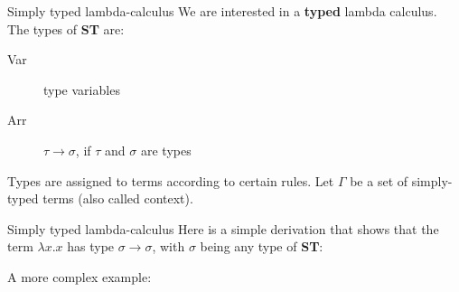 \documentclass[10pt]{beamer}
\begin{document}
\begin{frame}{Simply typed lambda-calculus}
       We are interested in a {\bf typed} lambda calculus. The types of {\bf ST} are:
        \begin{description}
     \item[Var] type variables 
     \item[Arr] $\tau \rightarrow \sigma$, if $\tau$ and $\sigma$ are types
       \end{description}
       Types are assigned to terms according to certain rules. Let $\Gamma$ be a set of simply-typed terms (also called context). 
       \begin{prooftree}
                 \end{prooftree}

         \begin{prooftree}
         \end{prooftree}

         \begin{prooftree}
         \end{prooftree}
\end{frame}
\begin{frame}{Simply typed lambda-calculus}
         Here is a simple derivation that shows that the term $\lambda x. x$ has type $\sigma \rightarrow \sigma$, with $\sigma$ being any type of {\bf ST}: \begin{prooftree}
         \end{prooftree}

A more complex example:             
          \begin{prooftree}
         \end{prooftree}
\end{frame}
\end{document}
